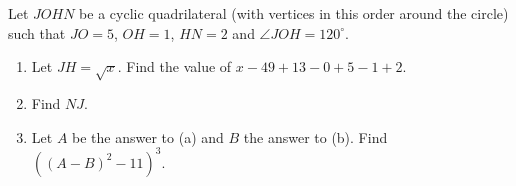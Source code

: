Let $JOHN$ be a cyclic quadrilateral (with vertices in this order around the circle) such that $JO=5$, $OH=1$, $HN=2$ and $\angle JOH=120^\circ$.
\begin{enumerate}
\item[(a)] Let $JH=\sqrt x$. Find the value of $x-49+13-0+5-1+2$.
\item[(b)] Find $NJ$.
\item[(c)] Let $A$ be the answer to (a) and $B$ the answer to (b). Find $\left((A-B)^2-11\right)^3$.
\end{enumerate}
